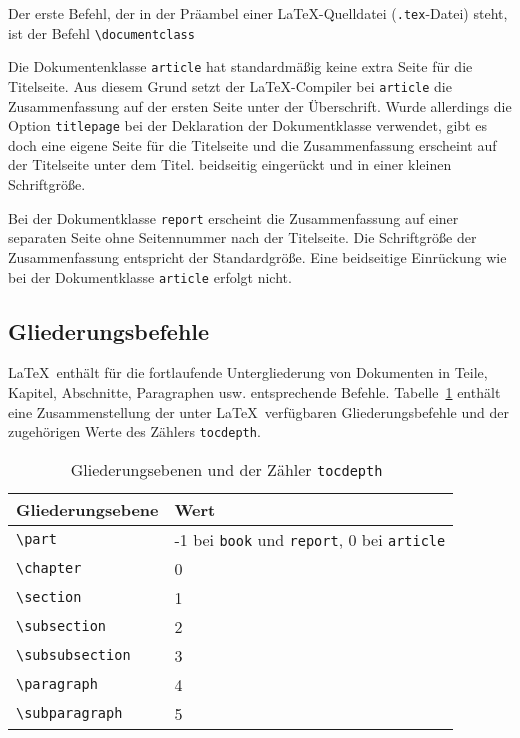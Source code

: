 Der erste Befehl, der in der Präambel einer \LaTeX-Quelldatei (\verb!.tex!-Datei) steht, ist der Befehl \verb!\documentclass!
\begin{document}

Die Dokumentenklasse \verb!article! hat standardmäßig keine extra Seite für die Titelseite.
Aus diesem Grund setzt der \LaTeX-Compiler bei \verb|article|
die Zusammenfassung auf der ersten
Seite unter der Überschrift. Wurde allerdings die 
Option \verb!titlepage! bei der Deklaration der Dokumentklasse verwendet,
gibt es doch eine eigene Seite für die Titelseite und die Zusammenfassung 
erscheint auf der Titelseite unter dem Titel. 
beidseitig eingerückt und in einer kleinen Schriftgröße.


Bei der Dokumentklasse \verb!report!
erscheint die Zusammenfassung 
auf einer separaten Seite ohne
Seitennummer nach der Titelseite. 
Die Schriftgröße der Zusammenfassung entspricht der Standardgröße. Eine
beidseitige Einrückung wie bei der 
Dokumentklasse \verb!article! erfolgt nicht.




\subsection{Gliederungsbefehle}

\LaTeX\ enthält für die 
fortlaufende Untergliederung von Dokumenten in Teile, 
Kapitel, Abschnitte, Paragraphen usw. entsprechende
Befehle.
Tabelle~\ref{Tabelle_Gliederungsebenen} enthält eine 
Zusammenstellung der unter \LaTeX\
verfügbaren Gliederungsbefehle 
und der zugehörigen Werte des Zählers
\verb!tocdepth!.


\begin{table}[h!tb]
	\centering
	\caption[Gliederungsebenen und der Zähler \texttt{tocdepth}]{Gliederungsebenen und der Zähler \texttt{tocdepth}~\cite{Schlosser2009}}
	\label{Tabelle_Gliederungsebenen}       %
	\begin{tabular}{ll}
		\hline
		Gliederungsebene                      & Wert \\
		\hline
		\texttt{\textbackslash part}          & -1 bei \texttt{book} und \texttt{report}, 0 bei \texttt{article}  \\
		\texttt{\textbackslash chapter}       & 0    \\
		\texttt{\textbackslash section}       & 1    \\
		\texttt{\textbackslash subsection}    & 2    \\
		\texttt{\textbackslash subsubsection} & 3    \\
		\texttt{\textbackslash paragraph}     & 4    \\
		\texttt{\textbackslash subparagraph}  & 5    \\
		\hline
	\end{tabular}
\end{table}
\end{document}
